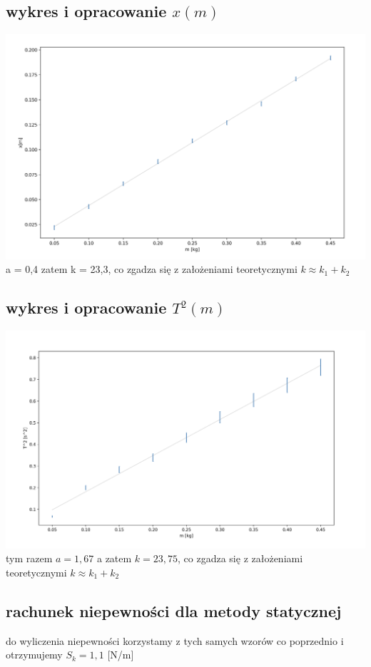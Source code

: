 \documentclass{article}
\begin{document}
\subsection{wykres i opracowanie $x(m)$}
\includegraphics[width=15cm]{m7_4a}
a = 0,4 zatem k = 23,3, co zgadza się z założeniami teoretycznymi $k\approx k_1 + k_2$ 

\subsection{wykres i opracowanie $T^2(m)$}
\includegraphics[width=15cm]{m7_4b}\\
tym razem $a=1,67$ a zatem $k = 23,75$,  co zgadza się z założeniami teoretycznymi $k\approx k_1 + k_2$ 

\subsection{rachunek niepewności dla metody statycznej}
do wyliczenia niepewności korzystamy z tych samych wzorów co poprzednio i otrzymujemy
$S_k = 1,1$ [N/m]
\end{document}
